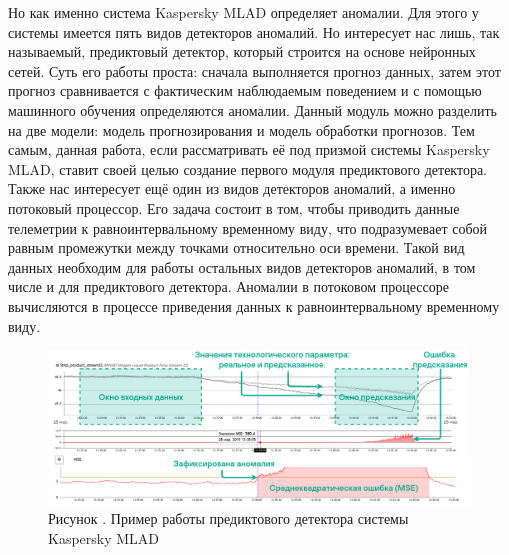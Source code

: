 {  \par \redline Но как именно система Kaspersky MLAD определяет аномалии. Для этого у системы имеется пять видов детекторов аномалий. Но интересует нас лишь, так называемый, предиктовый детектор, который строится на основе нейронных сетей. Суть его работы проста: сначала выполняется прогноз данных, затем этот прогноз сравнивается с фактическим наблюдаемым поведением и с помощью машинного обучения определяются аномалии. Данный модуль можно разделить на две модели: модель прогнозирования и модель обработки прогнозов. Тем самым, данная работа, если рассматривать её под призмой системы Kaspersky MLAD, ставит своей целью создание первого модуля предиктового детектора. Также нас интересует ещё один из видов детекторов аномалий, а именно потоковый процессор. Его задача состоит в том, чтобы приводить данные телеметрии к равноинтервальному временному виду, что подразумевает собой равным промежутки между точками относительно оси времени. Такой вид данных необходим для работы остальных видов детекторов аномалий, в том числе и для предиктового детектора. Аномалии в потоковом процессоре вычисляются в процессе приведения данных к равноинтервальному временному виду.

  \begin{figure}
    \centering
    \def\svgwidth{\textwidth}
    \includegraphics[scale=0.6]{images/MLADex.png}
    \caption*{\gostFont Рисунок \thechaptercntr .\theimagecntr \spc {--} Пример работы предиктового детектора системы Kaspersky MLAD}
    \label{fig:MLADBlackBox}
  \end{figure}

}

